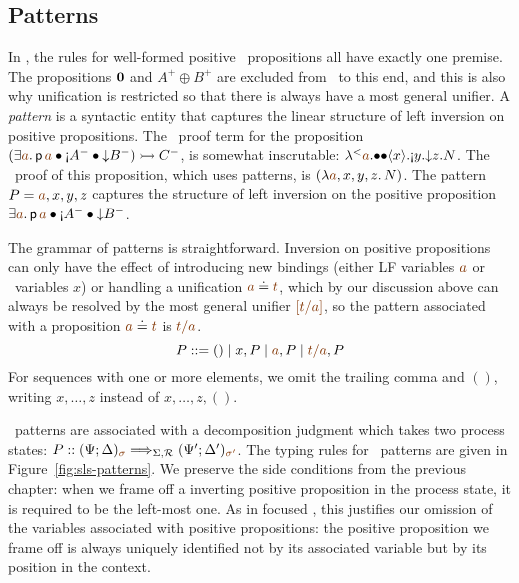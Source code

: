 \subsection{Patterns}
\label{sec:framework-patterns}


In \ollll, the rules for well-formed positive \sls~propositions all
have exactly one premise.  The propositions $\mathbf{0}$ and $A^+ \oplus
B^+$ are excluded from \sls~to this end, and this is also why
unification is restricted so that there is always have a most general
unifier.
%
A {\it pattern} is a syntactic entity that captures the linear
structure of left inversion on positive propositions. The \ollll~proof
term for the proposition
%
$(\exists \lf{a}.\,{\sf p}\,\lf{a} 
             \fuse {\gnab}A^-
             \fuse {\downarrow}B^-) \lefti C^-$,
%
is somewhat inscrutable:
${\tlaml{\texistsl{\lf{a}}
    {\tfusel{\tfusel{\tetap{x}{\tgnabl{y}{\tdownl{z}{N}}}}}}}}$. The
\sls~proof of this proposition, which uses patterns, is
$(\lambda \lf{a},x,y,z.\, N)$. The pattern $P = \lf{a}, x,y,z$ captures
the structure of left inversion on the positive proposition 
$\exists \lf{a}.\,{\sf p}\,\lf{a} 
             \fuse {\gnab}A^-
             \fuse {\downarrow}B^-$.

The grammar of patterns is straightforward.
% 
Inversion on positive propositions
can only have the effect of introducing new bindings (either LF
variables $\lf{a}$ or \sls~variables $x$) or handling a unification
$\lf{a} \doteq \lf{t}$, which by our discussion above can always be
resolved by the most general unifier $\lf{[t/a]}$, so the pattern associated
with a proposition $\lf{a} \doteq \lf{t}$ is $\lf{t/a}$. 
\[
P ::= () \mid x, P \mid \lf{a}, P \mid \lf{t/a}, P
\] 
For sequences with one or more elements, we omit the trailing
comma and $()$, writing $x, \ldots, z$ 
instead of $x, \ldots, z, ()$. 

\sls~patterns are associated with a decomposition judgment which takes
two process states: $P :: (\Psi; \Delta)_{\lf{\sigma}}
\Longrightarrow_{\Sigma,\subord} (\Psi'; \Delta')_{\lf{\sigma'}}$.
The typing rules for \sls~patterns are given in
Figure~\ref{fig:sls-patterns}. We preserve the side conditions from
the previous chapter: when we frame off a inverting positive
proposition in the process state, it is required to be the left-most
one. As in focused \ollll, this justifies our omission of the
variables associated with positive propositions: the positive
proposition we frame off is always uniquely identified not by its
associated variable but by its position in the context. 

